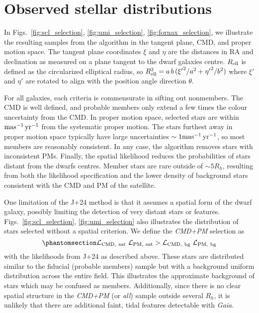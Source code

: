 \section{Observed stellar
distributions}\label{observed-stellar-distributions}

In
Figs.~\ref{fig:scl_selection}, \ref{fig:umi_selection}, \ref{fig:fornax_selection},
we illustrate the resulting samples from the algorithm in the tangent
plane, CMD, and proper motion space. The tangent plane coordinates
\(\xi\) and \(\eta\) are the distances in RA and declination as measured
on a plane tangent to the dwarf galaxies centre. \(R_{\rm ell}\) is
defined as the circularized elliptical radius, so
\(R_{\rm ell}^2 = a\,b\,({\xi'}^2 / a^2 + {\eta'}^2 / b^2)\) where
\(\xi'\) and \(\eta'\) are rotated to align with the position angle
direction \(\theta\).

For all galaxies, each criteria is commensurate in sifting out
nonmembers. The CMD is well defined, and probable members only extend a
few times the colour uncertainty from the CMD. In proper motion space,
selected stars are within \({\rm mas^{-1}\,yr^{-1}}\) from the systematic proper motion.
The stars furthest away in proper motion space typically have large
uncertainties \(\sim 1{\rm mas^{-1}\,yr^{-1}}\), so most members are reasonably
consistent. In any case, the algorithm removes stars with inconsistent
PMs. Finally, the spatial likelihood reduces the probabilities of stars
distant from the dwarfs centres. Member stars are rare outside of
\(\sim5R_h\), resulting from both the likelihood specification and the
lower density of background stars consistent with the CMD and PM of the
satellite.

One limitation of the J+24 method is that it assumes a spatial form of
the dwarf galaxy, possibly limiting the detection of very distant stars
or features. Figs.~\ref{fig:scl_selection}, \ref{fig:umi_selection} also
illustrates the distribution of stars selected without a spatial
criterion. We define the \emph{CMD+PM} selection as
\begin{equation}\protect\phantomsection\label{eq:sel_cmd_pm}{
{\cal L}_{\rm CMD,\ sat}\ {\cal L}_{\rm PM,\ sat} > {\cal L}_{\rm CMD,\ bg}\ {\cal L}_{\rm PM,\ bg}
}\end{equation} with the likelihoods from J+24 as described above. These
stars are distributed similar to the fiducial (probable members) sample
but with a background uniform distribution across the entire field. This
illustrates the approximate background of stars which may be confused as
members. Additionally, since there is no clear spatial structure in the
\emph{CMD+PM} (or \emph{all}) sample outside several \(R_h\), it is
unlikely that there are additional faint, tidal features detectable with
\emph{Gaia}.

